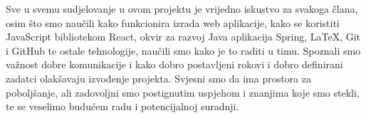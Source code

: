           Sve u svemu sudjelovanje u ovom projektu je vrijedno iskustvo za svakoga člana, osim što smo naučili kako funkcionira izrada web aplikacije, kako se koristiti JavaScript bibliotekom React, okvir za razvoj Java aplikacija Spring, LaTeX, Git i GitHub te ostale tehnologije, naučili smo kako je to raditi u timu.  Spoznali smo važnost dobre komunikacije i kako dobro postavljeni rokovi i dobro definirani zadatci olakšavaju izvođenje projekta. Svjesni smo da ima prostora za poboljšanje, ali zadovoljni smo postignutim uspjehom i znanjima koje smo stekli, te se veselimo budućem radu i potencijalnoj suradnji.
		
		\eject 
